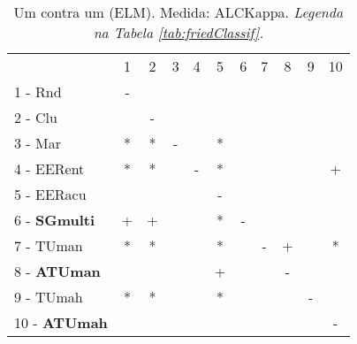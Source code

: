 \begin{table}[h]
\caption{Um contra um (ELM). Medida: ALCKappa. \textit{Legenda na Tabela \ref{tab:friedClassif}.}}
\begin{center}\begin{tabular}{lcc|cc|cc|cc|cc}
 			& 1 & 2 & 3 & 4 & 5 & 6 & 7 & 8 & 9 & 10\\
1 - Rnd  	& - &   &   &   &   &   &   &   &   &   \\
2 - Clu  	&   & - &   &   &   &   &   &   &   &   \\ \hline
3 - Mar  	& * & * & - &   & * &   &   &   &   &   \\
4 - EERent	& * & * &   & - & * &   &   &   &   & + \\ \hline
5 - EERacu	&   &   &   &   & - &   &   &   &   &   \\
6 - \textbf{SGmulti}	& + & + &   &   & * & - &   &   &   &   \\ \hline
7 - TUman	& * & * &   &   & * &   & - & + &   & * \\
8 - \textbf{ATUman}	&   &   &   &   & + &   &   & - &   &   \\ \hline
9 - TUmah	& * & * &   &   & * &   &   &   & - &   \\
10 - \textbf{ATUmah}	&   &   &   &   &   &   &   &   &   & - \\ \hline\end{tabular}
\label{stratsALCKappaFriedELMRedux}
\end{center}
\end{table}